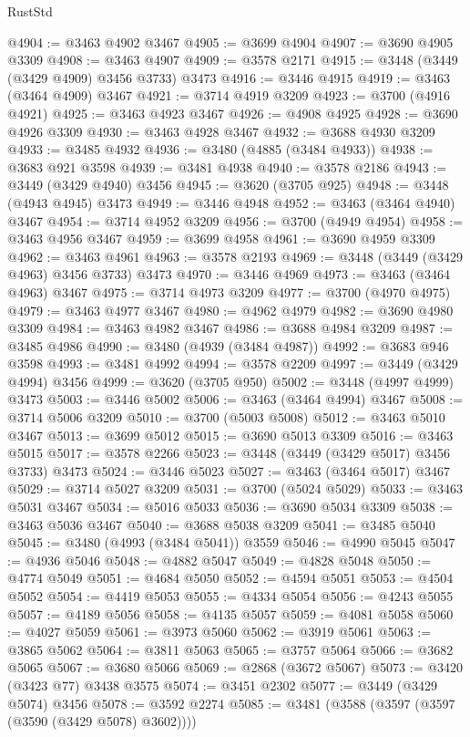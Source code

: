 \begin{lexlean}{RustStd}
\begin{coremodule}
{{{{{{{{{{{{{{{{{{{@4904 := @3463 @4902 @3467
@4905 := @3699 @4904
@4907 := @3690 @4905 @3309
@4908 := @3463 @4907
@4909 := @3578 @2171
@4915 := @3448 (@3449 (@3429 @4909) @3456 @3733) @3473
@4916 := @3446 @4915
@4919 := @3463 (@3464 @4909) @3467
@4921 := @3714 @4919 @3209
@4923 := @3700 (@4916 @4921)
@4925 := @3463 @4923 @3467
@4926 := @4908 @4925
@4928 := @3690 @4926 @3309
@4930 := @3463 @4928 @3467
@4932 := @3688 @4930 @3209
@4933 := @3485 @4932
@4936 := @3480 (@4885 (@3484 @4933))
@4938 := @3683 @921 @3598
@4939 := @3481 @4938
@4940 := @3578 @2186
@4943 := @3449 (@3429 @4940) @3456
@4945 := @3620 (@3705 @925)
@4948 := @3448 (@4943 @4945) @3473
@4949 := @3446 @4948
@4952 := @3463 (@3464 @4940) @3467
@4954 := @3714 @4952 @3209
@4956 := @3700 (@4949 @4954)
@4958 := @3463 @4956 @3467
@4959 := @3699 @4958
@4961 := @3690 @4959 @3309
@4962 := @3463 @4961
@4963 := @3578 @2193
@4969 := @3448 (@3449 (@3429 @4963) @3456 @3733) @3473
@4970 := @3446 @4969
@4973 := @3463 (@3464 @4963) @3467
@4975 := @3714 @4973 @3209
@4977 := @3700 (@4970 @4975)
@4979 := @3463 @4977 @3467
@4980 := @4962 @4979
@4982 := @3690 @4980 @3309
@4984 := @3463 @4982 @3467
@4986 := @3688 @4984 @3209
@4987 := @3485 @4986
@4990 := @3480 (@4939 (@3484 @4987))
@4992 := @3683 @946 @3598
@4993 := @3481 @4992
@4994 := @3578 @2209
@4997 := @3449 (@3429 @4994) @3456
@4999 := @3620 (@3705 @950)
@5002 := @3448 (@4997 @4999) @3473
@5003 := @3446 @5002
@5006 := @3463 (@3464 @4994) @3467
@5008 := @3714 @5006 @3209
@5010 := @3700 (@5003 @5008)
@5012 := @3463 @5010 @3467
@5013 := @3699 @5012
@5015 := @3690 @5013 @3309
@5016 := @3463 @5015
@5017 := @3578 @2266
@5023 := @3448 (@3449 (@3429 @5017) @3456 @3733) @3473
@5024 := @3446 @5023
@5027 := @3463 (@3464 @5017) @3467
@5029 := @3714 @5027 @3209
@5031 := @3700 (@5024 @5029)
@5033 := @3463 @5031 @3467
@5034 := @5016 @5033
@5036 := @3690 @5034 @3309
@5038 := @3463 @5036 @3467
@5040 := @3688 @5038 @3209
@5041 := @3485 @5040
@5045 := @3480 (@4993 (@3484 @5041)) @3559
@5046 := @4990 @5045
@5047 := @4936 @5046
@5048 := @4882 @5047
@5049 := @4828 @5048
@5050 := @4774 @5049
@5051 := @4684 @5050
@5052 := @4594 @5051
@5053 := @4504 @5052
@5054 := @4419 @5053
@5055 := @4334 @5054
@5056 := @4243 @5055
@5057 := @4189 @5056
@5058 := @4135 @5057
@5059 := @4081 @5058
@5060 := @4027 @5059
@5061 := @3973 @5060
@5062 := @3919 @5061
@5063 := @3865 @5062
@5064 := @3811 @5063
@5065 := @3757 @5064
@5066 := @3682 @5065
@5067 := @3680 @5066
@5069 := @2868 (@3672 @5067)
@5073 := @3420 (@3423 @77) @3438 @3575
@5074 := @3451 @2302
@5077 := @3449 (@3429 @5074) @3456
@5078 := @3592 @2274
@5085 := @3481 (@3588 (@3597 (@3597 (@3590 (@3429 @5078) @3602))))
}}}}}}}}}}}}}}}}}}}
\end{coremodule}
\end{lexlean}
